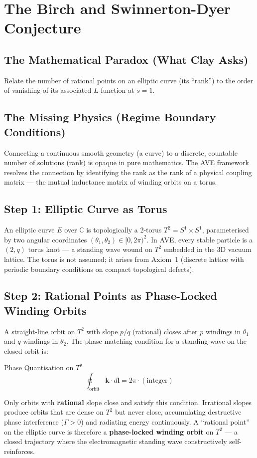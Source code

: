 \section{The Birch and Swinnerton-Dyer Conjecture}
\label{sec:bsd_millennium}

\subsection{The Mathematical Paradox (What Clay Asks)}
Relate the number of rational points on an elliptic curve (its ``rank'') to the order of vanishing of its associated $L$-function at $s=1$.

\subsection{The Missing Physics (Regime Boundary Conditions)}
Connecting a continuous smooth geometry (a curve) to a discrete, countable number of solutions (rank) is opaque in pure mathematics. The AVE framework resolves the connection by identifying the rank as the rank of a physical coupling matrix --- the mutual inductance matrix of winding orbits on a torus.

\subsection{Step 1: Elliptic Curve as Torus}

An elliptic curve $E$ over $\mathbb{C}$ is topologically a 2-torus $T^2 = S^1 \times S^1$, parameterised by two angular coordinates $(\theta_1, \theta_2) \in [0, 2\pi)^2$. In AVE, every stable particle is a $(2,q)$ torus knot --- a standing wave wound on $T^2$ embedded in the 3D vacuum lattice. The torus is not assumed; it arises from Axiom~1 (discrete lattice with periodic boundary conditions on compact topological defects).

\subsection{Step 2: Rational Points as Phase-Locked Winding Orbits}

A straight-line orbit on $T^2$ with slope $p/q$ (rational) closes after $p$ windings in $\theta_1$ and $q$ windings in $\theta_2$. The phase-matching condition for a standing wave on the closed orbit is:
\begin{resultbox}{Phase Quantisation on $T^2$}
\begin{equation}
    \oint_{\text{orbit}} \mathbf{k} \cdot d\mathbf{l} = 2\pi \cdot (\text{integer})
\end{equation}
\end{resultbox}
Only orbits with \textbf{rational} slope close and satisfy this condition. Irrational slopes produce orbits that are dense on $T^2$ but never close, accumulating destructive phase interference ($\Gamma > 0$) and radiating energy continuously. A ``rational point'' on the elliptic curve is therefore a \textbf{phase-locked winding orbit} on $T^2$ --- a closed trajectory where the electromagnetic standing wave constructively self-reinforces.


